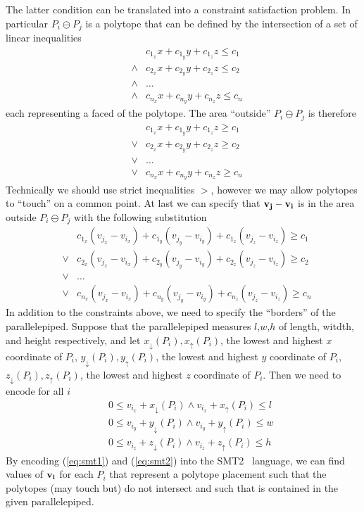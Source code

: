 The latter condition can be translated into a constraint satisfaction
problem. In particular $P_i \ominus P_j$ is a polytope that can be
defined by the intersection of a set of linear inequalities
\begin{eqnarray}
\nonumber
&        & c_{1_x} x + c_{1_y} y + c_{1_z} z \leq c_1 \\
\nonumber
& \wedge & c_{2_x} x + c_{2_y} y + c_{2_z} z \leq c_2 \\
\nonumber
& \wedge & \ldots \\
\nonumber
& \wedge & c_{n_x} x + c_{n_y} y + c_{n_z} z \leq c_n
\end{eqnarray}
each representing a faced of the polytope. The
area ``outside'' $P_i \ominus P_j$ is therefore
\begin{eqnarray}
\nonumber
&      & c_{1_x} x + c_{1_y} y + c_{1_z} z \geq c_1 \\
\nonumber
& \vee & c_{2_x} x + c_{2_y} y + c_{2_z} z \geq c_2 \\
\nonumber
& \vee & \ldots \\
\nonumber
& \vee & c_{n_x} x + c_{n_y} y + c_{n_z} z \geq c_n
\end{eqnarray}
Technically we should use strict inequalities $>$, however
we may allow polytopes to ``touch'' on a common point. At last
we can specify that $\mathbf{v_j} - \mathbf{v_i}$ is in the
area outside $P_i \ominus P_j$ with the following substitution
\begin{eqnarray}
\nonumber
&      & c_{1_x} (v_{j_x} - v_{i_x}) + c_{1_y} (v_{j_y} - v_{i_y}) + c_{1_z} (v_{j_z}-v_{i_z}) \geq c_1 \\
\nonumber
& \vee & c_{2_x} (v_{j_x} - v_{i_x}) + c_{2_y} (v_{j_y} - v_{i_y}) + c_{2_z} (v_{j_z}-v_{i_z}) \geq c_2 \\
\label{eq:smt1}
& \vee &\ldots \\                                                                                    
\nonumber
& \vee & c_{n_x} (v_{j_x} - v_{i_x}) + c_{n_y} (v_{j_y} - v_{i_y}) + c_{n_z} (v_{j_z}-v_{i_z}) \geq c_n
\end{eqnarray}
In addition to the constraints above, we need to specify the ``borders'' of the parallelepiped. Suppose
that the parallelepiped measures $l$,$w$,$h$ of length, witdth, and height respectively, and let
$x_\downarrow(P_i), x_\uparrow(P_i)$, the lowest and highest $x$ coordinate of $P_i$, 
$y_\downarrow(P_i), y_\uparrow(P_i)$, the lowest and highest $y$ coordinate of $P_i$, 
$z_\downarrow(P_i), z_\uparrow(P_i)$, the lowest and highest $z$ coordinate of $P_i$. Then we
need to encode for all $i$
\begin{eqnarray}
\nonumber
&& 0 \leq v_{i_x} + x_\downarrow(P_i) \wedge v_{i_x} + x_\uparrow(P_i) \leq l \\
\label{eq:smt2}
&& 0 \leq v_{i_y} + y_\downarrow(P_i) \wedge v_{i_y} + y_\uparrow(P_i) \leq w \\
\nonumber
&& 0 \leq v_{i_z} + z_\downarrow(P_i) \wedge v_{i_z} + z_\uparrow(P_i) \leq h
\end{eqnarray}
By encoding (\ref{eq:smt1}) and (\ref{eq:smt2}) into the SMT2~\cite{SMTLIB} language, we can find
values of $\mathbf{v_i}$ for each $P_i$ that represent a polytope placement such
that the polytopes (may touch but) do not intersect and such that
is contained in the given parallelepiped.
